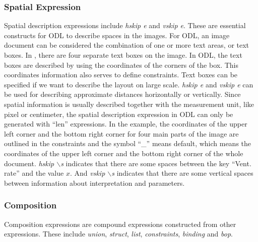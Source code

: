 {\subsubsection{Spatial Expression}
Spatial description expressions include %
{\em hskip e} and {\em vskip e}. 
These are essential constructs for ODL to describe spaces in the images. 
For ODL, an image document can be considered the combination of 
one or more text areas, or text boxes. In , 
there are four separate text boxes on the image. 
In ODL, the text boxes are described by using the coordinates of 
the corners of the box. This coordinates information also serves to define 
constraints. Text boxes can be specified if we want 
to describe the layout on large scale. 
{\em hskip e} and {\em vskip e} can be used for describing 
approximate distances horizontally or vertically. 
Since spatial information is usually described together with the 
measurement unit, like pixel or centimeter, 
the spatial description expression in ODL can only 
be generated with ``len'' expressions. 
In the example, the coordinates of the upper left corner and 
the bottom right corner for four main parts of the image are outlined in the 
constraints and the symbol ``\_'' means default, which means the 
coordinates of the upper left corner and the bottom right corner of the 
whole document. {\em hskip $\backslash$s} indicates that there are some spaces 
between the key ``Vent. rate'' and the value $x$. And {\em vskip $\backslash$s} 
indicates that there are some vertical spaces between information about 
interpretation and parameters. 

\subsubsection{Composition}
Composition expressions are compound expressions constructed from other
expressions. These include 
{\em union}, {\em struct}, {\em list}, 
{\em constraints}, {\em binding} and {\em bop}.

}
